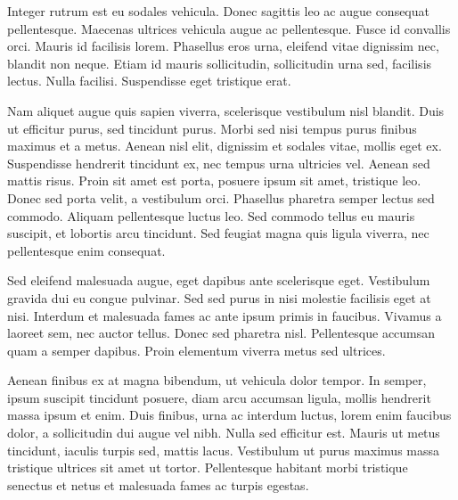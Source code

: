 \documentclass[10pt, a4paper]{article}
\theoremstyle{theorem-style}
\theoremstyle{definition-style}
\theoremstyle{remark-style}
\theoremstyle{example-style}
\theoremstyle{definition-style}
\theoremstyle{remark-style}
\begin{document}
Integer rutrum est eu sodales vehicula. Donec sagittis leo ac augue consequat pellentesque. Maecenas ultrices vehicula augue ac pellentesque. Fusce id convallis orci. Mauris id facilisis lorem. Phasellus eros urna, eleifend vitae dignissim nec, blandit non neque. Etiam id mauris sollicitudin, sollicitudin urna sed, facilisis lectus. Nulla facilisi. Suspendisse eget tristique erat.

Nam aliquet augue quis sapien viverra, scelerisque vestibulum nisl blandit. Duis ut efficitur purus, sed tincidunt purus. Morbi sed nisi tempus purus finibus maximus et a metus. Aenean nisl elit, dignissim et sodales vitae, mollis eget ex. Suspendisse hendrerit tincidunt ex, nec tempus urna ultricies vel. Aenean sed mattis risus. Proin sit amet est porta, posuere ipsum sit amet, tristique leo. Donec sed porta velit, a vestibulum orci. Phasellus pharetra semper lectus sed commodo. Aliquam pellentesque luctus leo. Sed commodo tellus eu mauris suscipit, et lobortis arcu tincidunt. Sed feugiat magna quis ligula viverra, nec pellentesque enim consequat.

Sed eleifend malesuada augue, eget dapibus ante scelerisque eget. Vestibulum gravida dui eu congue pulvinar. Sed sed purus in nisi molestie facilisis eget at nisi. Interdum et malesuada fames ac ante ipsum primis in faucibus. Vivamus a laoreet sem, nec auctor tellus. Donec sed pharetra nisl. Pellentesque accumsan quam a semper dapibus. Proin elementum viverra metus sed ultrices.

Aenean finibus ex at magna bibendum, ut vehicula dolor tempor. In semper, ipsum suscipit tincidunt posuere, diam arcu accumsan ligula, mollis hendrerit massa ipsum et enim. Duis finibus, urna ac interdum luctus, lorem enim faucibus dolor, a sollicitudin dui augue vel nibh. Nulla sed efficitur est. Mauris ut metus tincidunt, iaculis turpis sed, mattis lacus. Vestibulum ut purus maximus massa tristique ultrices sit amet ut tortor. Pellentesque habitant morbi tristique senectus et netus et malesuada fames ac turpis egestas.
\end{document}
